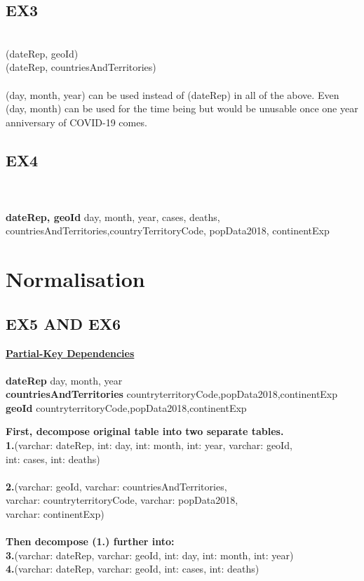 \documentclass[12pt]{extarticle}
\begin{document}
    \vspace{0.4cm} 
    \subsection{EX3}
    \vspace{0.2cm}
    \\(dateRep, geoId)
    \\(dateRep, countriesAndTerritories)
    \\\\(day, month, year) can be used instead of (dateRep) in all of the above. Even (day, month) can be used for the time being but would be unusable once one year anniversary of COVID-19 comes.
    
    \vspace{1cm}
    \subsection{EX4}
    \vspace{0.2cm}
    \\\\\textbf{dateRep, geoId} \to day, month, year, cases, deaths, \\countriesAndTerritories,countryTerritoryCode, popData2018, continentExp
\vspace{1cm}
\section{Normalisation}
    \vspace{0.4cm}
    \subsection{EX5 AND EX6}
    \vspace{0.4cm}
    \underline{\textbf{Partial-Key Dependencies}}
    \\\\\textbf{dateRep} \to day, month, year
    \\\textbf{countriesAndTerritories} \to countryterritoryCode,popData2018,continentExp
    \\\textbf{geoId} \to countryterritoryCode,popData2018,continentExp
    \newline
    
    \textbf{First, decompose original table into two separate tables.}
    \\\textbf{1.}(varchar: dateRep, int: day, int: month, int: year, varchar: geoId, \\int: cases, int: deaths)
    \\\\\textbf{2.}(varchar: geoId, varchar: countriesAndTerritories, \\varchar: countryterritoryCode, varchar: popData2018, \\varchar: continentExp)
    \\\\\textbf{Then decompose (1.) further into:}
    \\\textbf{3.}(varchar: dateRep, varchar: geoId, int: day, int: month, int: year)
    \\\textbf{4.}(varchar: dateRep, varchar: geoId, int: cases, int: deaths)
    
\end{document}
